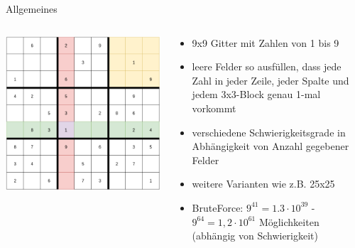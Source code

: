 \begin{frame}{Allgemeines}
    \begin{columns}[T] %
        \begin{column}{0.55\textwidth}
            \vspace*{0.2cm}
            \includegraphics[width=\textwidth]{Pictures/Leer.png}
        \end{column}
        \begin{column}{0.55\textwidth}
            \begin{itemize}
                \item 9x9 Gitter mit Zahlen von 1 bis 9
                \item leere Felder so ausfüllen, dass jede Zahl in
                jeder Zeile, jeder Spalte und jedem 3x3-Block genau 1-mal vorkommt
                \item verschiedene Schwierigkeitsgrade in Abhängigkeit von Anzahl 
                gegebener Felder
                \item weitere Varianten wie z.B. 25x25
                \item BruteForce: \(9^{41}=1.3\cdot 10^{39}\) - \(9^{64}=1,2\cdot 10^{61}\) Möglichkeiten (abhängig von Schwierigkeit)
            \end{itemize}
        \end{column}
    \end{columns}
\end{frame}


